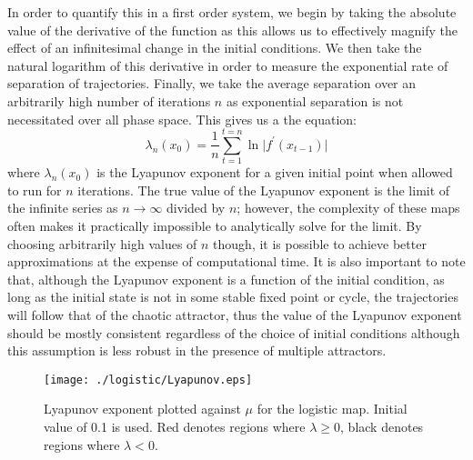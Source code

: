 In order to quantify this in a first order system, we begin by taking the absolute value of the derivative of the function as this allows us to effectively magnify the effect of an infinitesimal change in the initial conditions. We then take the natural logarithm of this derivative in order to measure the exponential rate of separation of trajectories. Finally, we take the average separation over an arbitrarily high number of iterations $n$ as exponential separation is not necessitated over all phase space. This gives us a the equation:
\begin{equation}
    \lambda_n(x_0)=\frac{1}{n}\sum^{t=n}_{t=1}\ln\lvert f^\prime(x_{t-1})\rvert
\end{equation}
where $\lambda_n(x_0)$ is the Lyapunov exponent for a given initial point when allowed to run for $n$ iterations. The true value of the Lyapunov exponent is the limit of the infinite series as $n\rightarrow\infty$ divided by $n$; however, the complexity of these maps often makes it practically impossible to analytically solve for the limit. By choosing arbitrarily high values of $n$ though, it is possible to achieve better approximations at the expense of computational time. It is also important to note that, although the Lyapunov exponent is a function of the initial condition, as long as the initial state is not in some stable fixed point or cycle, the trajectories will follow that of the chaotic attractor, thus the value of the Lyapunov exponent should be mostly consistent regardless of the choice of initial conditions although this assumption is less robust in the presence of multiple attractors.
\begin{figure}
    \centering
    \texttt{[image: ./logistic/Lyapunov.eps]}
    \caption{Lyapunov exponent plotted against $\mu$ for the logistic map. Initial value of 0.1 is used. Red denotes regions where $\lambda\geq0$, black denotes regions where $\lambda<0$.}
    \label{log_Lyapunov}
\end{figure}


